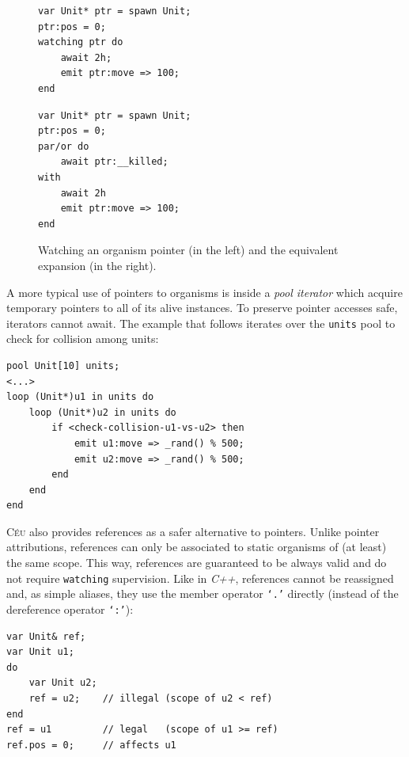 \documentclass[preprint]{sigplanconf}
\newcommand{\CEU}{\textsc{C\'{e}u}\xspace}
\newcommand{\code}[1] {{\small{\texttt{#1}}}}
\newcommand{\1}{\;}
\newcommand{\2}{\;\;}
\newcommand{\3}{\;\;\;}
\newcommand{\5}{\;\;\;\;\;}
\begin{document}
\begin{figure}%
\begin{minipage}[t]{0.48\linewidth}
\begin{lstlisting}
var Unit* ptr = spawn Unit;
ptr:pos = 0;
watching ptr do
    await 2h;
    emit ptr:move => 100;
end
\end{lstlisting}
\end{minipage}
%
\begin{minipage}[t]{0.48\linewidth}
\begin{lstlisting}
var Unit* ptr = spawn Unit;
ptr:pos = 0;
par/or do
    await ptr:__killed;
with
    await 2h
    emit ptr:move => 100;
end
\end{lstlisting}
\end{minipage}
\caption{ Watching an organism pointer (in the left) and the equivalent 
expansion (in the right).
\label{lst.watching}
}
\end{figure}

A more typical use of pointers to organisms is inside a \emph{pool iterator} 
which acquire temporary pointers to all of its alive instances.
To preserve pointer accesses safe, iterators cannot await.
The example that follows iterates over the \code{units} pool to check for 
collision among units:


\begin{lstlisting}
pool Unit[10] units;
<...>
loop (Unit*)u1 in units do
    loop (Unit*)u2 in units do
        if <check-collision-u1-vs-u2> then
            emit u1:move => _rand() % 500;
            emit u2:move => _rand() % 500;
        end
    end
end
\end{lstlisting}

\CEU also provides references as a safer alternative to pointers.
Unlike pointer attributions, references can only be associated to static 
organisms of (at least) the same scope.
This way, references are guaranteed to be always valid and do not require
\code{watching} supervision.
Like in \emph{C++}, references cannot be reassigned and, as simple aliases, 
they use the member operator \code{`.'} directly (instead of the dereference 
operator \code{`:'}):

\begin{lstlisting}
var Unit& ref;
var Unit u1;
do
    var Unit u2;
    ref = u2;    // illegal (scope of u2 < ref)
end
ref = u1         // legal   (scope of u1 >= ref)
ref.pos = 0;     // affects u1
\end{lstlisting}
\end{document}
